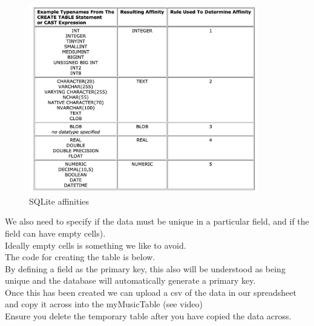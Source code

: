 \documentclass[a4paper,12pt]{article}
\begin{document}
\begin{figure}[!h]
	\centering
	\includegraphics[width=10cm]{sqlite_affinities.png}
	\caption*{SQLite affinities}
\end{figure}

We also need to specify if the data must be unique in a particular field, and if the field can have empty cells).\\
Ideally empty cells is something we like to avoid.\\
The code for creating the table is below.\\
By defining a field as the primary key, this also will be understood as being unique and the database will automatically generate a primary key.\\

 



Once this has been created we can upload a csv of the data in our spreadsheet and copy it across into the myMusicTable (see video)\\



Ensure you delete the temporary table after you have copied the data across.

\end{document}
